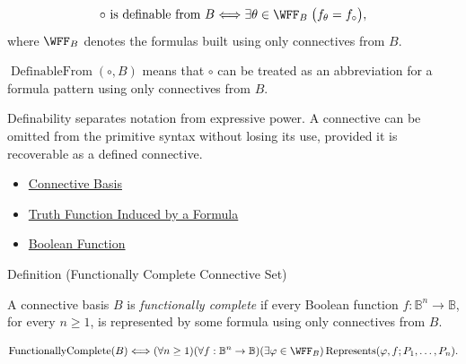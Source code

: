 \begin{remark*}
\[
\circ\text{ is definable from }B
\Longleftrightarrow
\exists\theta\in\WFF_B\;\bigl(f_{\theta}=f_{\circ}\bigr),
\]
where \(\WFF_B\) denotes the formulas built using only connectives from \(B\).
\end{remark*}

\begin{remark*}
\(\operatorname{DefinableFrom}(\circ,B)\) means that \(\circ\) can be treated as
an abbreviation for a formula pattern using only connectives from \(B\).
\end{remark*}

\begin{remark*}[Interpretation]
Definability separates notation from expressive power. A connective can be
omitted from the primitive syntax without losing its use, provided it is
recoverable as a defined connective.
\end{remark*}

\begin{dependencies}
\begin{itemize}
  \item \hyperref[def:connective-basis-propositional-logic]{Connective Basis}
  \item \hyperref[def:truth-function-induced-by-formula]{Truth Function Induced by a Formula}
  \item \hyperref[def:boolean-function-propositional-logic]{Boolean Function}
\end{itemize}
\end{dependencies}

\begin{definitionbox}{Definition (Functionally Complete Connective Set)}
\begin{definition}
\label{def:functionally-complete-connective-set-propositional-logic}
A connective basis \(B\) is \emph{functionally complete} if every Boolean
function \(f:\mathbb{B}^n\to\mathbb{B}\), for every \(n\ge 1\), is represented
by some formula using only connectives from \(B\).
\end{definition}
\end{definitionbox}

\begin{remark*}
\[
\operatorname{FunctionallyComplete}(B)
\Longleftrightarrow
(\forall n\ge 1)(\forall f:\mathbb{B}^n\to\mathbb{B})(\exists\varphi\in\WFF_B)
\operatorname{Represents}(\varphi,f;P_1,\ldots,P_n).
\]
\end{remark*}

